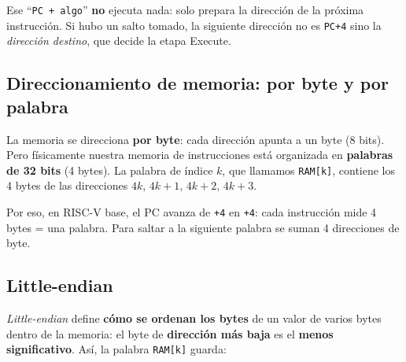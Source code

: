 \documentclass[11pt]{article}
\newcommand{\code}[1]{\texttt{#1}}
\begin{document}
\noindent
Ese ``\code{PC + algo}'' \textbf{no} ejecuta nada: solo prepara la dirección de
la próxima instrucción. Si hubo un salto tomado, la siguiente dirección no es
\code{PC+4} sino la \emph{dirección destino}, que decide la etapa Execute.

\subsection{Direccionamiento de memoria: por byte y por palabra}

La memoria se direcciona \textbf{por byte}: cada dirección apunta a un byte (8
bits). Pero físicamente nuestra memoria de instrucciones está organizada en
\textbf{palabras de 32 bits} (4 bytes). La palabra de índice $k$, que llamamos
\code{RAM[k]}, contiene los 4 bytes de las direcciones $4k,\,4k{+}1,\,4k{+}2,\,4k{+}3$.

Por eso, en RISC-V base, el PC avanza de \code{+4} en \code{+4}: cada instrucción
mide 4 bytes = una palabra. Para saltar a la siguiente palabra se suman 4
direcciones de byte.

\begin{center}
\end{center}

\subsection{Little-endian}

\emph{Little-endian} define \textbf{cómo se ordenan los bytes} de un valor de
varios bytes dentro de la memoria: el byte de \textbf{dirección más baja} es el
\textbf{menos significativo}. Así, la palabra \code{RAM[k]} guarda:

\begin{center}
\end{center}
\end{document}
